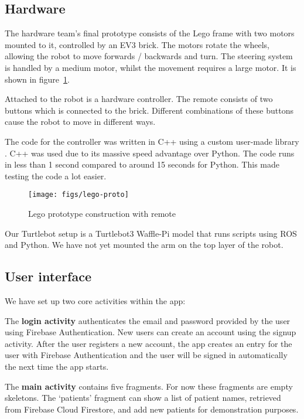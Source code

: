 \documentclass{article}
\begin{document}
\subsection{Hardware}

The hardware team's final prototype consists of the Lego frame with two motors mounted to it, controlled by an EV3 brick. The motors rotate the wheels, allowing the robot to move forwards / backwards and turn. The steering system is handled by a medium motor, whilst the movement requires a large motor. It is shown in figure~\ref{fig:lego-proto}.

Attached to the robot is a hardware controller. The remote consists of two buttons which is connected to the brick. Different combinations of these buttons cause the robot to move in different ways.

The code for the controller was written in C++ using a custom user-made library \cite{cpp}. C++ was used due to its massive speed advantage over Python. The code runs in less than 1 second compared to around 15 seconds for Python. This made testing the code a lot easier.

\begin{figure}[tb]
\vskip 5mm
\begin{center}
\centerline{\texttt{[image: figs/lego-proto]}}
\caption{Lego prototype construction with remote}
\label{fig:lego-proto}
\end{center}
\vskip -5mm
\end{figure}

Our Turtlebot setup is a Turtlebot3 Waffle-Pi model that runs scripts using ROS and Python. We have not yet mounted the arm on the top layer of the robot. 

\subsection{User interface}
We have set up two core activities within the app:

The {\bf login activity} authenticates the email and password provided by the user using Firebase Authentication. New users can create an account using the signup activity. After the user registers a new account, the app creates an entry for the user with Firebase Authentication and the user will be signed in automatically the next time the app starts.

The {\bf main activity} contains five fragments. For now these fragments are empty skeletons. The `patients' fragment can show a list of patient names, retrieved from Firebase Cloud Firestore, and add new patients for demonstration purposes.
\end{document}

